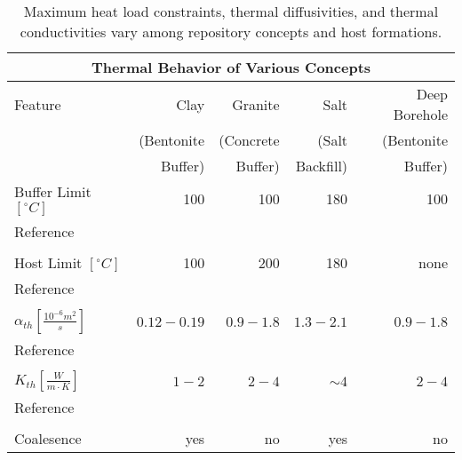 %
\begin{table}[h!]
  \centering
  \footnotesize{
  \begin{tabular}{|l|r|r|r|r|}
    \multicolumn{5}{c}{\textbf{Thermal Behavior of Various Concepts}}\\
    \hline
    Feature & Clay & Granite & Salt & Deep Borehole \\ 
            & (Bentonite & (Concrete & (Salt & (Bentonite\\ 
            & Buffer) & Buffer) & Backfill) & Buffer) \\ 
    \hline
    Buffer Limit $[^{\circ}C]$ & 100  & 100  & 180 & 100  \\ 
    Reference
    & \cite{hardin_generic_2011}   
    & \cite{von-lensa_red_2008}   
    & \cite{von-lensa_red_2008,brewitz_long-term_2002,carter_thermal_2011}   
    & \cite{von-lensa_red_2008}  \\ 
    &      &      &     &      \\
    Host Limit $[^{\circ}C]$   & 100  & 200  & 180 & none \\ 
    Reference                     
    & \cite{<++>}   
    & \cite{<++>}   
    & \cite{<++>}   
    & \cite{<++>}   \\
    &      &      &     &      \\
    $\alpha_{th} [\frac{10^{-6}m^2}{s}]$ & $0.12-0.19$ & $0.9-1.8$ & $1.3-2.1$ & $0.9-1.8$ \\ 
    Reference                     
    & \cite{tikhonravova_effect_2007} 
    & \cite{durham_thermal_1987,hardin_generic_2011,kim_thermal_2007}     
    & \cite{hardin_generic_2011,nieland_storage_2001}   
    & \cite{durham_thermal_1987,hardin_generic_2011,kim_thermal_2007}   \\ 
    &      &      &     &      \\
    $K_{th} [\frac{W}{m{\cdot}K}]$ & $1-2$ & $2-4$ & $\sim4$  & $2-4$ \\ 
    Reference                     
    & \cite{hardin_generic_2011,tikhonravova_effect_2007}    
    & \cite{hardin_generic_2011,kim_thermal_2007,surma_porosity_2003,ab_long-term_2006}    
    & \cite{hardin_generic_2011,nieland_storage_2001}
    & \cite{hardin_generic_2011,kim_thermal_2007,surma_porosity_2003}\\ 
    &      &      &     &      \\
    Coalesence & yes & no & yes & no \\ 
    \hline
  \end{tabular}
  \caption[Models for Heat Transport for Various Geologies]{Maximum heat load constraints, thermal 
  diffusivities, and thermal conductivities vary among repository concepts and host formations. }
  }
  \label{tab:heat_tab}
\end{table}
